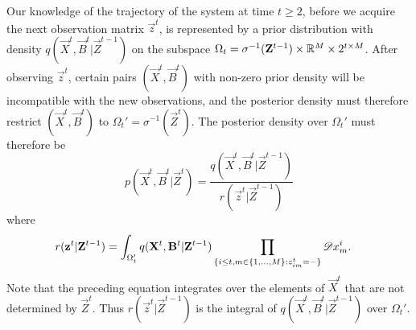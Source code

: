 Our knowledge of the trajectory of the system at time $t \geq 2$, before we acquire the next observation matrix $\vec{z}^t$, is represented by a prior distribution with density $q(\vec{X}^t, \vec{B}^t | \vec{Z}^{t-1})$ on the subspace $\Omega_t = \sigma^{-1}(\mathbf{Z}^{t-1}) \times \mathbb R^M \times 2^{t \times M}$. After observing $\vec{z}^t$, certain pairs $(\vec{X}^t, \vec{B}^t)$ with non-zero prior density will be incompatible with the new observations, and the posterior density must therefore restrict $(\vec{X}^t, \vec{B}^t)$ to $\Omega_t' = \sigma^{-1}(\vec{Z}^t)$. The posterior density over $\Omega_t'$ must therefore be
\begin{equation*}
    p(\vec{X}^t, \vec{B}^t |\vec{Z}^t) =
        \frac{q(\vec{X}^t, \vec{B}^t | \vec{Z}^{t-1})}
        {r(\vec{z}^t | \vec{Z}^{t-1})} 
\end{equation*}
where
\begin{align*}
    r(\mathbf{z}^t | \mathbf{Z}^{t-1})  &= \int_{\Omega_t'} q(\mathbf{X}^t, \mathbf{B}^t | \mathbf{Z}^{t-1}) \prod_{ \{ i \leq t, m \in \{1, \ldots, M \} : z^t_{im} = - \} } \mathscr{D} x^i_m.
\end{align*}
Note that the preceding equation integrates over the elements of $\vec{X}^t$ that are not determined by $\vec{Z}^t$. Thus $r(\vec{z}^t | \vec{Z}^{t-1})$ is the integral of $q(\vec{X}^t, \vec{B}^t | \vec{Z}^{t-1})$ over $\Omega_t'$. 

